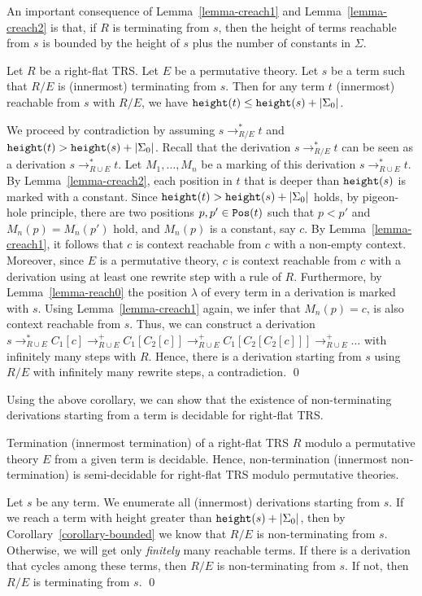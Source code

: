 \documentclass{LMCS}
\theoremstyle{plain}
\newcommand\Pos{{\tt Pos}}
\begin{document}
An important consequence of Lemma~\ref{lemma-creach1}
and Lemma~\ref{lemma-creach2}
is that, if $R$ is terminating from $s$,
then the height of terms reachable from $s$ is
bounded by the height of $s$ plus the number of
constants in $\Sigma$.
\begin{cor}\label{corollary-bounded}
Let $R$ be a right-flat TRS.
Let $E$ be a permutative theory.
Let $s$ be a term
such that $R/E$ is (innermost) terminating from $s$.
Then for any term $t$ (innermost) reachable from $s$ with $R/E$,
we have ${\tt height}(t) \leq {\tt height}(s) + |\Sigma_0|$.
\end{cor}
\proof
We proceed by contradiction by assuming
$s\to_{R/E}^*t$ and ${\tt height}(t) > {\tt height}(s) + |\Sigma_0|$.
Recall that the derivation $s\to_{R/E}^*t$ can be seen
as a derivation $s\to_{R\cup E}^*t$.
Let $M_1,\ldots,M_n$ be a marking of this derivation
$s\rightarrow_{R\cup E}^* t$.
By Lemma~\ref{lemma-creach2}, each position in $t$ that
is deeper than ${\tt height}(s)$ is marked with a constant.
Since
${\tt height}(t) > {\tt height}(s) + |\Sigma_0|$ holds,
by pigeon-hole principle, there are two positions
$p,p'\in\Pos(t)$ such that
$p < p'$ and $M_n(p) = M_n(p')$ hold, and $M_n(p)$ is a constant, say $c$.
By Lemma~\ref{lemma-creach1}, it follows that
$c$ is context reachable from $c$ with a non-empty context.
Moreover, since $E$ is a permutative theory,
$c$ is context reachable from $c$ with a derivation using
at least one rewrite step with a rule of $R$.
Furthermore,
by Lemma~\ref{lemma-reach0} the position $\lambda$ of every term in
a derivation is marked with $s$.
Using Lemma~\ref{lemma-creach1} again,
we infer that $M_n(p)=c$, is also context reachable from $s$.
Thus, we can construct a derivation
$s \rightarrow_{R\cup E}^* C_1[c] \rightarrow_{R\cup E}^+
C_1[C_2[c]] \rightarrow_{R\cup E}^+ C_1[C_2[C_2[c]]]
\rightarrow_{R\cup E}^+ \ldots$ with infinitely many
steps with $R$.
Hence, there is a derivation starting from $s$ using $R/E$
with infinitely many rewrite steps, a contradiction. \qed


Using the above corollary, we can show that 
the existence of non-terminating derivations 
starting from a term is decidable for right-flat TRS. 
\begin{thm}\label{theorem-c}
Termination (innermost termination) of a right-flat TRS $R$
modulo a permutative theory $E$ from
a given term is decidable. Hence, non-termination 
(innermost non-termination) is
semi-decidable for right-flat TRS modulo permutative theories.
\end{thm}
\proof
Let $s$ be any term.
We enumerate all (innermost) derivations starting from $s$.
If we reach a term with height greater than
${\tt height}(s) + |\Sigma_0|$,
then by Corollary~\ref{corollary-bounded} we know
that $R/E$ is non-terminating from $s$.
Otherwise, we will get only {\em finitely} many
reachable terms.  If there is a derivation that 
cycles among these terms, then $R/E$ is non-terminating
from $s$. If not, then $R/E$ is terminating from $s$.  \qed
\end{document}
